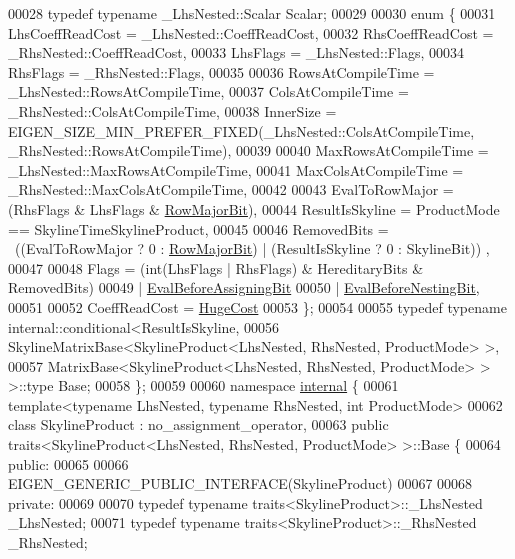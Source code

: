 \begin{DoxyCode}
00028     \textcolor{keyword}{typedef} \textcolor{keyword}{typename} \_LhsNested::Scalar Scalar;
00029 
00030     \textcolor{keyword}{enum} \{
00031         LhsCoeffReadCost = \_LhsNested::CoeffReadCost,
00032         RhsCoeffReadCost = \_RhsNested::CoeffReadCost,
00033         LhsFlags = \_LhsNested::Flags,
00034         RhsFlags = \_RhsNested::Flags,
00035 
00036         RowsAtCompileTime = \_LhsNested::RowsAtCompileTime,
00037         ColsAtCompileTime = \_RhsNested::ColsAtCompileTime,
00038         InnerSize = EIGEN\_SIZE\_MIN\_PREFER\_FIXED(\_LhsNested::ColsAtCompileTime, 
      \_RhsNested::RowsAtCompileTime),
00039 
00040         MaxRowsAtCompileTime = \_LhsNested::MaxRowsAtCompileTime,
00041         MaxColsAtCompileTime = \_RhsNested::MaxColsAtCompileTime,
00042 
00043         EvalToRowMajor = (RhsFlags & LhsFlags & \hyperlink{group__flags_gae4f56c2a60bbe4bd2e44c5b19cbe8762}{RowMajorBit}),
00044         ResultIsSkyline = ProductMode == SkylineTimeSkylineProduct,
00045 
00046         RemovedBits = ~((EvalToRowMajor ? 0 : \hyperlink{group__flags_gae4f56c2a60bbe4bd2e44c5b19cbe8762}{RowMajorBit}) | (ResultIsSkyline ? 0 : SkylineBit))
      ,
00047 
00048         Flags = (int(LhsFlags | RhsFlags) & HereditaryBits & RemovedBits)
00049         | \hyperlink{group__flags_ga0972b20dc004d13984e642b3bd12532e}{EvalBeforeAssigningBit}
00050         | \hyperlink{group__flags_gaa34e83bae46a8eeae4e69ebe3aaecbed}{EvalBeforeNestingBit},
00051 
00052         CoeffReadCost = \hyperlink{namespace_eigen_a3163430a1c13173faffde69016b48aaf}{HugeCost}
00053     \};
00054 
00055     \textcolor{keyword}{typedef} \textcolor{keyword}{typename} internal::conditional<ResultIsSkyline,
00056             SkylineMatrixBase<SkylineProduct<LhsNested, RhsNested, ProductMode> >,
00057             MatrixBase<SkylineProduct<LhsNested, RhsNested, ProductMode> > >::type Base;
00058 \};
00059 
00060 \textcolor{keyword}{namespace }\hyperlink{namespaceinternal}{internal} \{
00061 \textcolor{keyword}{template}<\textcolor{keyword}{typename} LhsNested, \textcolor{keyword}{typename} RhsNested, \textcolor{keywordtype}{int} ProductMode>
00062 \textcolor{keyword}{class }SkylineProduct : no\_assignment\_operator,
00063 \textcolor{keyword}{public} traits<SkylineProduct<LhsNested, RhsNested, ProductMode> >::Base \{
00064 \textcolor{keyword}{public}:
00065 
00066     EIGEN\_GENERIC\_PUBLIC\_INTERFACE(SkylineProduct)
00067 
00068 \textcolor{keyword}{private}:
00069 
00070     \textcolor{keyword}{typedef} \textcolor{keyword}{typename} traits<SkylineProduct>::\_LhsNested \_LhsNested;
00071     \textcolor{keyword}{typedef} \textcolor{keyword}{typename} traits<SkylineProduct>::\_RhsNested \_RhsNested;

\end{DoxyCode}
